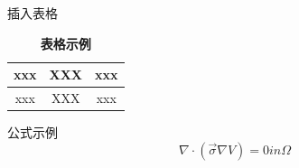 \begin{spacing}{1.5}
{    插入表格
    \begin{table}[thp]
        \caption{  \bf 表格示例}
         \hwfs
        \vspace{0.2cm}
        \centering        
        \begin{tabular}{c|c|c}%
            \hline  %
            xxx & XXX & xxx\\
            \hline  %
            xxx & XXX & xxx\\
            \hline %
        \end{tabular}
        \vspace{0.4cm}
   \end{table}

    公式示例
    \begin{equation}
        \nabla\cdot(\vec\sigma \nabla V)=0  in \Omega
   \end{equation}

\clearpage
}
\end{spacing}
\newpage